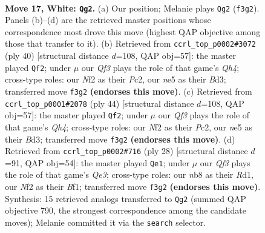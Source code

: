 \documentclass[11pt]{article}
\begin{document}
\clearpage

\begin{figure}[p]\centering
\begin{subfigure}{0.46\textwidth}\centering
\resizebox{\linewidth}{!}{%
\newchessgame
\chessboard[
  setfen={rnb3kr/1p6/2p1p3/p2pn2p/N2P3q/5QP1/PPP2N1P/2KR1B1R w - - 1 17},
  showmover=false,
  pgfstyle=straightmove, color=movearrow, markmove={f3-g2}
]}
\caption{}
\end{subfigure}\hfill
\begin{subfigure}{0.46\textwidth}\centering
\resizebox{\linewidth}{!}{%
\newchessgame
\chessboard[
  setfen={r1b2rk1/5pp1/p4n1p/2pp4/5qPQ/2NB1P2/PPP4P/1K1R2R1 w - - 0 21},
  showmover=false,
  pgfstyle=straightmove, color=movearrow, markmove={h4-f2}
]}
\caption{}
\end{subfigure}
\\[4pt]
\begin{subfigure}{0.46\textwidth}\centering
\resizebox{\linewidth}{!}{%
\newchessgame
\chessboard[
  setfen={r1b2rk1/5pp1/p4n1p/2pp4/5qPQ/2NB1P2/PPP4P/1K1R2R1 w - - 0 23},
  showmover=false,
  pgfstyle=straightmove, color=movearrow, markmove={h4-f2}
]}
\caption{}
\end{subfigure}\hfill
\begin{subfigure}{0.46\textwidth}\centering
\resizebox{\linewidth}{!}{%
\newchessgame
\chessboard[
  setfen={r1b1k2r/3p1ppp/p1p1p3/4q3/4P1n1/2N1Q3/PPP2PPP/2KR1B1R w kq - 6 15},
  showmover=false,
  pgfstyle=straightmove, color=movearrow, markmove={e3-e1}
]}
\caption{}
\end{subfigure}
\caption{\textbf{Move 17, White: \texttt{Qg2}.} (a) Our position; Melanie plays \texttt{Qg2} (\texttt{f3g2}). Panels (b)--(d) are the retrieved master positions whose correspondence most drove this move (highest QAP objective among those that transfer to it). (b) Retrieved from \texttt{ccrl\_top\_p0002\#3072} (ply 40) [structural distance $d$=108, QAP obj=57]: the master played \texttt{Qf2}; under $\mu$ our \emph{Qf3} plays the role of that game's \emph{Qh4}; cross-type roles: our \emph{N}f2 as their \emph{P}c2, our \emph{n}e5 as their \emph{B}d3; transferred move \texttt{f3g2} \textbf{(endorses this move)}. (c) Retrieved from \texttt{ccrl\_top\_p0001\#2078} (ply 44) [structural distance $d$=108, QAP obj=57]: the master played \texttt{Qf2}; under $\mu$ our \emph{Qf3} plays the role of that game's \emph{Qh4}; cross-type roles: our \emph{N}f2 as their \emph{P}c2, our \emph{n}e5 as their \emph{B}d3; transferred move \texttt{f3g2} \textbf{(endorses this move)}. (d) Retrieved from \texttt{ccrl\_top\_p0002\#716} (ply 28) [structural distance $d$=91, QAP obj=54]: the master played \texttt{Qe1}; under $\mu$ our \emph{Qf3} plays the role of that game's \emph{Qe3}; cross-type roles: our \emph{n}b8 as their \emph{R}d1, our \emph{N}f2 as their \emph{B}f1; transferred move \texttt{f3g2} \textbf{(endorses this move)}. Synthesis: 15 retrieved analogs transferred to \texttt{Qg2} (summed QAP objective 790, the strongest correspondence among the candidate moves); Melanie committed it via the \texttt{search} selector.}
\label{fig:thought-m32}
\end{figure}
\end{document}
